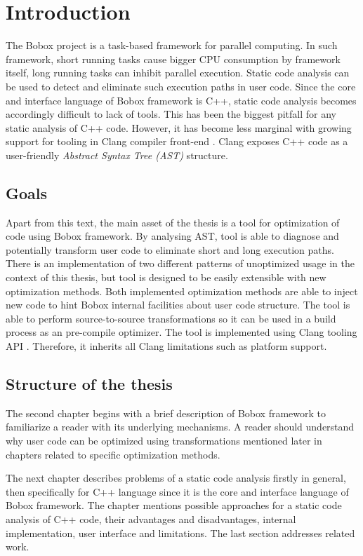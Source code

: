 \chapter{Introduction}
The Bobox project is a task-based framework for parallel computing. In such framework, short running tasks cause bigger CPU consumption by framework itself, long running tasks can inhibit parallel execution. Static code analysis can be used to detect and eliminate such execution paths in user code. Since the core and interface language of Bobox framework is C++, static code analysis becomes accordingly difficult to lack of tools. This has been the biggest pitfall for any static analysis of C++ code. However, it has become less marginal with growing support for tooling in Clang compiler front-end \cite{clang}. Clang exposes C++ code as a user-friendly \emph{Abstract Syntax Tree (AST)} \cite{ast} structure.

\section{Goals}
Apart from this text, the main asset of the thesis is a tool for optimization of code using Bobox framework. By analysing AST, tool is able to diagnose and potentially transform user code to eliminate short and long execution paths. There is an implementation of two different patterns of unoptimized usage in the context of this thesis, but tool is designed to be easily extensible with new optimization methods. Both implemented optimization methods are able to inject new code to hint Bobox internal facilities about user code structure. The tool is able to perform source-to-source transformations so it can be used in a build process as an pre-compile optimizer. The tool is implemented using Clang tooling API \cite{clang-documentation}. Therefore, it inherits all Clang limitations such as platform support.

\section{Structure of the thesis}
The second chapter begins with a brief description of Bobox framework to familiarize a reader with its underlying mechanisms. A reader should understand why user code can be optimized using transformations mentioned later in chapters related to specific optimization methods.

The next chapter describes problems of a static code analysis firstly in general, then specifically for C++ language since it is the core and interface language of Bobox framework. The chapter mentions possible approaches for a static code analysis of C++ code, their advantages and disadvantages, internal implementation, user interface and limitations. The last section addresses related work.

